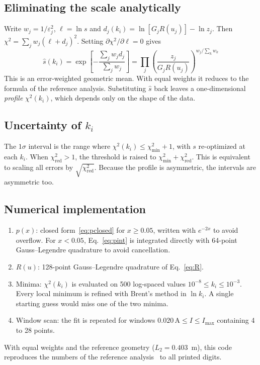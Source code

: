 \documentclass[11pt,a4paper]{article}
\newcommand{\kan}{k_i}
\begin{document}
\subsection{Eliminating the scale analytically}
Write $w_j = 1/\varepsilon_j^2$, $\ell=\ln s$ and $d_j(\kan) = \ln[G_jR(u_j)] - \ln z_j$. Then $\chi^2 = \sum_j w_j(\ell+d_j)^2$. Setting $\partial\chi^2/\partial\ell = 0$ gives
\begin{equation}
\boxed{\;\hat s(\kan) = \exp\!\left[-\frac{\sum_j w_j d_j}{\sum_j w_j}\right]
= \prod_j\left(\frac{z_j}{G_jR(u_j)}\right)^{w_j/\sum_k w_k}\;}
\label{eq:shat}
\end{equation}
This is an error-weighted geometric mean. With equal weights it reduces to the formula of the reference analysis. Substituting $\hat s$ back leaves a one-dimensional \emph{profile} $\chi^2(\kan)$, which depends only on the shape of the data.

\subsection{Uncertainty of $\kan$}
The $1\sigma$ interval is the range where $\chi^2(\kan)\le\chi^2_\text{min}+1$, with $s$ re-optimized at each $\kan$. When $\chi^2_\text{red}>1$, the threshold is raised to $\chi^2_\text{min}+\chi^2_\text{red}$. This is equivalent to scaling all errors by $\sqrt{\chi^2_\text{red}}$. Because the profile is asymmetric, the intervals are asymmetric too.

\subsection{Numerical implementation}
\begin{enumerate}
\item $p(x)$: closed form~\eqref{eq:pclosed} for $x\ge0.05$, written with $e^{-2x}$ to avoid overflow. For $x<0.05$, Eq.~\eqref{eq:pint} is integrated directly with 64-point Gauss--Legendre quadrature to avoid cancellation.
\item $R(u)$: 128-point Gauss--Legendre quadrature of Eq.~\eqref{eq:R}.
\item Minima: $\chi^2(\kan)$ is evaluated on 500 log-spaced values $10^{-8}\le\kan\le10^{-3}$. Every local minimum is refined with Brent's method in $\ln\kan$. A single starting guess would miss one of the two minima.
\item Window scan: the fit is repeated for windows $0.020\,\text{A}\le I\le I_\text{max}$ containing 4 to 28 points.
\end{enumerate}
With equal weights and the reference geometry ($L_2 = 0.403$~m), this code reproduces the numbers of the reference analysis~\cite{wang2026} to all printed digits.
\end{document}
